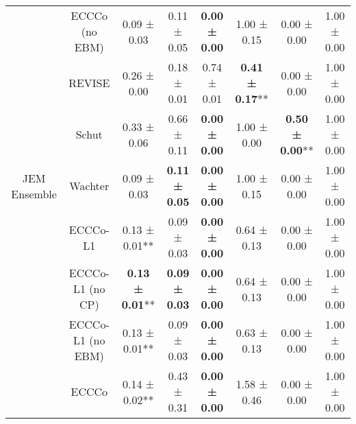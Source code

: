 \begin{table}
{\begin{tabular}[t]{cccccccc}
 & ECCCo (no EBM) & 0.09 ± 0.03\hphantom{*}\hphantom{*} & 0.11 ± 0.05\hphantom{*}\hphantom{*} & \textbf{0.00 ± 0.00}\hphantom{*}\hphantom{*} & 1.00 ± 0.15\hphantom{*}\hphantom{*} & 0.00 ± 0.00\hphantom{*}\hphantom{*} & 1.00 ± 0.00\hphantom{*}\hphantom{*}\\

 & REVISE & 0.26 ± 0.00\hphantom{*}\hphantom{*} & 0.18 ± 0.01\hphantom{*}\hphantom{*} & 0.74 ± 0.01\hphantom{*}\hphantom{*} & \textbf{0.41 ± 0.17}** & 0.00 ± 0.00\hphantom{*}\hphantom{*} & 1.00 ± 0.00\hphantom{*}\hphantom{*}\\

 & Schut & 0.33 ± 0.06\hphantom{*}\hphantom{*} & 0.66 ± 0.11\hphantom{*}\hphantom{*} & \textbf{0.00 ± 0.00}\hphantom{*}\hphantom{*} & 1.00 ± 0.00\hphantom{*}\hphantom{*} & \textbf{0.50 ± 0.00}** & 1.00 ± 0.00\hphantom{*}\hphantom{*}\\

\multirow[t]{-9}{*}{\centering\arraybackslash JEM Ensemble} & Wachter & 0.09 ± 0.03\hphantom{*}\hphantom{*} & \textbf{0.11 ± 0.05}\hphantom{*}\hphantom{*} & \textbf{0.00 ± 0.00}\hphantom{*}\hphantom{*} & 1.00 ± 0.15\hphantom{*}\hphantom{*} & 0.00 ± 0.00\hphantom{*}\hphantom{*} & 1.00 ± 0.00\hphantom{*}\hphantom{*}\\
\cmidrule{1-8}
 & ECCCo-L1 & 0.13 ± 0.01** & 0.09 ± 0.03\hphantom{*}\hphantom{*} & \textbf{0.00 ± 0.00}\hphantom{*}\hphantom{*} & 0.64 ± 0.13\hphantom{*}\hphantom{*} & 0.00 ± 0.00\hphantom{*}\hphantom{*} & 1.00 ± 0.00\hphantom{*}\hphantom{*}\\

 & ECCCo-L1 (no CP) & \textbf{0.13 ± 0.01}** & \textbf{0.09 ± 0.03}\hphantom{*}\hphantom{*} & \textbf{0.00 ± 0.00}\hphantom{*}\hphantom{*} & 0.64 ± 0.13\hphantom{*}\hphantom{*} & 0.00 ± 0.00\hphantom{*}\hphantom{*} & 1.00 ± 0.00\hphantom{*}\hphantom{*}\\

 & ECCCo-L1 (no EBM) & 0.13 ± 0.01** & 0.09 ± 0.03\hphantom{*}\hphantom{*} & \textbf{0.00 ± 0.00}\hphantom{*}\hphantom{*} & 0.63 ± 0.13\hphantom{*}\hphantom{*} & 0.00 ± 0.00\hphantom{*}\hphantom{*} & 1.00 ± 0.00\hphantom{*}\hphantom{*}\\

 & ECCCo & 0.14 ± 0.02** & 0.43 ± 0.31\hphantom{*}\hphantom{*} & \textbf{0.00 ± 0.00}\hphantom{*}\hphantom{*} & 1.58 ± 0.46\hphantom{*}\hphantom{*} & 0.00 ± 0.00\hphantom{*}\hphantom{*} & 1.00 ± 0.00\hphantom{*}\hphantom{*}\\


\end{tabular}}
\end{table}
